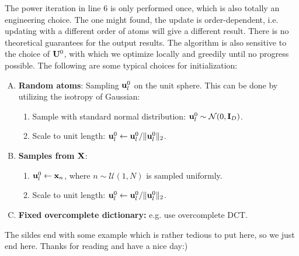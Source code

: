 \documentclass[../main.tex]{subfiles}
\begin{document}
The power iteration in line 6 is only performed once, which is also totally an engineering choice. The one might found, the update is order-dependent, i.e. updating with a different order of atoms will give a different result. There is no theoretical guarantees for the output results. The algorithm is also sensitive to the choice of ${\bf U}^0$, with which we optimize locally and greedily until no progress possible. The following are some typical choices for initialization:
\begin{enumerate}[A)]
	\item \textbf{Random atoms}: Sampling ${\bf u}_l^0$ on the unit sphere. This can be done by utilizing the isotropy of Gaussian:
	\begin{enumerate}[1.]
		\item Sample with standard normal distribution: ${\bf u}_l^0\sim \mathcal{N}(0,{\bf I}_D)$.
		\item Scale to unit length: ${\bf u}_l^0\leftarrow {\bf u}_l^0/\|{\bf u}_l^0\|_2$.
	\end{enumerate}
	\item \textbf{Samples from} ${\bf X}$:
	\begin{enumerate}[1.]
		\item ${\bf u}_l^0\leftarrow {\bf x}_n$, where $n\sim \mathcal{U}(1,N)$ is sampled uniformly.
		\item Scale to unit length: ${\bf u}_l^0\leftarrow {\bf u}_l^0/\|{\bf u}_l^0\|_2$.
	\end{enumerate}
	\item \textbf{Fixed overcomplete dictionary:} e.g. use overcomplete DCT.
\end{enumerate}
\par The sildes end with some example which is rather tedious to put here, so we just end here. Thanks for reading and have a nice day:)
\end{document}
